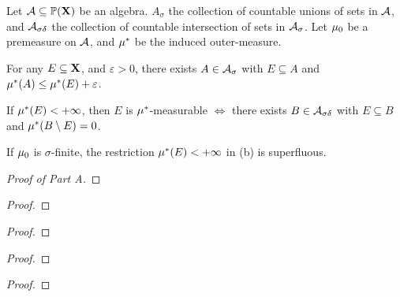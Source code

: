 \documentclass[../../main.tex]{subfiles}
\begin{document}
\begin{wts}
    Let $\mathcal{A}\subseteq\mathbb{P}({\mathbf{X}})$ be an algebra. $A_\sigma$ the collection of countable unions of sets in $\mathcal{A}$, and $\mathcal{A}_{\sigma\delta}$ the collection of countable intersection of sets in $\mathcal{A}_\sigma$. Let $\mu_0$ be a premeasure on $\mathcal{A}$, and $\mu^*$ be the induced outer-measure.
    \begin{enumalpha}
        \item For any $E\subseteq{\mathbf{X}}$, and $\varepsilon>0$, there exists $A\in\mathcal{A}_{\sigma}$ with $E\subseteq A$ and $\mu^*(A)\leq\mu^*(E)+\varepsilon$.
        \item If $\mu^*(E)<+\infty$, then $E$ is $\mu^*$-measurable $\iff$ there exists $B\in\mathcal{A}_{\sigma\delta}$ with $E\subseteq B$ and $\mu^*(B\setminus E) = 0$.
        \item If $\mu_0$ is $\sigma$-finite, the restriction $\mu^*(E)<+\infty$ in (b) is superfluous.
    \end{enumalpha}
\end{wts}
\begin{proof}[Proof of Part A]
    
\end{proof}

\newpage


\begin{wts}
    
\end{wts}
\begin{proof}
    
\end{proof}
\newpage


%


\begin{wts}
    
\end{wts}
\begin{proof}
    
\end{proof}
\newpage

%


\begin{wts}
    
\end{wts}
\begin{proof}
    
\end{proof}
\newpage


%


\begin{wts}
    
\end{wts}
\begin{proof}
    
\end{proof}
\newpage
\end{document}
